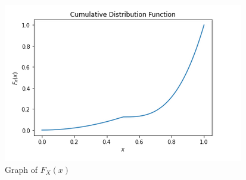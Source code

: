 \begin{figure}[!ht]
\centering
\includegraphics[width=\columnwidth]{solutions/ec/52/figures/cdfimage.png}
\caption{Graph of $F_X(x)$}
\end{figure}


